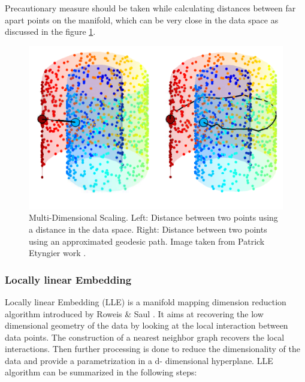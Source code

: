Precautionary measure should be taken while calculating distances between far apart points on the manifold, which can be very close in the data space as discussed in the figure \ref{isomap}.
\begin{figure}[ht]
\begin{center}
\includegraphics[width=\textwidth]{./Figures/isomap.png}
\caption {Multi-Dimensional Scaling. Left: Distance between two
points using a distance in the data space. Right: Distance between two points
using an approximated geodesic path. Image taken from Patrick Etyngier work \citep{Ety2008}.}
\label{isomap}
\end{center}
\end{figure}

\subsubsection{Locally linear Embedding}
\label{s:lle}
Locally linear Embedding (LLE) is a manifold mapping dimension reduction algorithm introduced by Roweis \& Saul \citep{Roweis2000}. It aims at recovering the low dimensional geometry of the data by looking at the local interaction between data points. The construction of a nearest neighbor graph recovers the local interactions. Then further processing is done to reduce the dimensionality of the data and provide a parametrization in a d- dimensional hyperplane. LLE algorithm can be summarized in the following steps:

